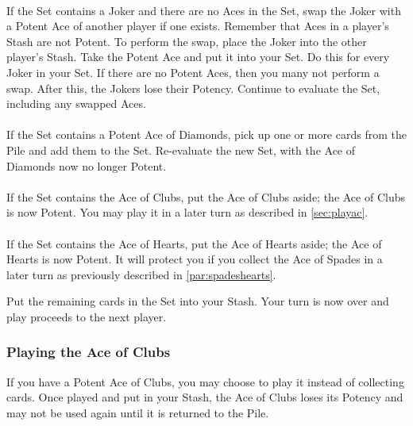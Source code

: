 \documentclass{article}
\begin{document}
\paragraph{\label{par:jokersetnoaces}}
If the Set contains a Joker and there are no Aces in the Set, swap the
Joker with a Potent Ace of another player if one exists.  Remember that
Aces in a player's Stash are not Potent. To perform the swap, place the
Joker into the other player's Stash. Take the Potent Ace and put it into
your Set. Do this for every Joker in your Set. If there are no Potent
Aces, then you many not perform a swap. After this, the Jokers lose
their Potency. Continue to evaluate the Set, including any swapped Aces.

\paragraph{\label{par:setdiamonds}}
If the Set contains a Potent Ace of Diamonds, pick up one or more cards
from the Pile and add them to the Set. Re-evaluate the new Set, with the
Ace of Diamonds now no longer Potent.

\paragraph{\label{par:setclubs}}
If the Set contains the Ace of Clubs, put the Ace of Clubs aside; the
Ace of Clubs is now Potent. You may play it in a later turn as described
in \autoref{sec:playac}.

\paragraph{\label{par:sethearts}}
If the Set contains the Ace of Hearts, put the Ace of Hearts aside; the
Ace of Hearts is now Potent. It will protect you if you collect the Ace
of Spades in a later turn as previously described in
\autoref{par:spadeshearts}.

Put the remaining cards in the Set into your Stash. Your turn is now
over and play proceeds to the next player.

\subsubsection{Playing the Ace of Clubs \label{sec:playac}}

If you have a Potent Ace of Clubs, you may choose to play it instead of
collecting cards. Once played and put in your Stash, the Ace of Clubs
loses its Potency and may not be used again until it is returned to the
Pile.
\end{document}
